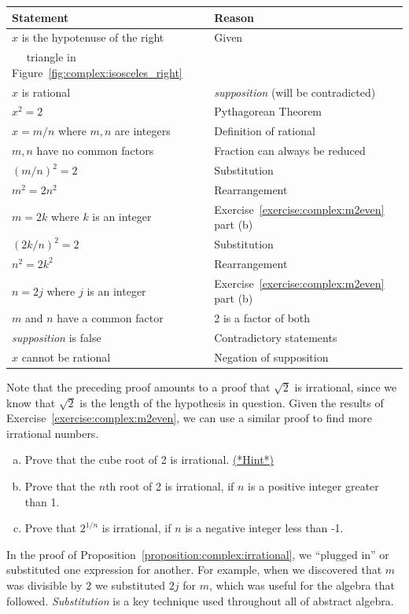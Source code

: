 \begin{tabular}{l| l}
Statement& Reason\\
\hline
$x$ is the hypotenuse of the right & Given\\
~~ triangle in Figure~\ref{fig:complex:isosceles_right} & ~\\
$x$ is rational & \emph{supposition} (will be contradicted)\\
$x^2 = 2$ & Pythagorean Theorem\\
$x = m/n$ where $m,n$ are integers& Definition of rational\\
$m, n$ have no common factors & Fraction can always be reduced\\
$(m/n)^2 = 2$ & Substitution\\
$m^2 = 2n^2$ & Rearrangement\\
$m = 2k$ where $k$ is an integer & Exercise~\ref{exercise:complex:m2even} part (b)\\
$(2k/n)^2 = 2$ & Substitution\\
$n^2 = 2k^2$& Rearrangement\\
$n = 2j$ where  $j$ is an integer&Exercise~\ref{exercise:complex:m2even} part (b)\\
$m$ and $n$ have a common factor& 2 is a factor of both\\
\emph{supposition} is false & Contradictory statements\\
$x$ cannot be rational &  Negation of supposition
\end{tabular}

Note that the preceding proof amounts to a proof that $\sqrt{2}$ is irrational, since we know that $\sqrt{2}$ is the length of the hypothesis in question. Given the results of Exercise~\ref{exercise:complex:m2even}, we can use a similar proof to find more irrational numbers.

\begin{exercise}{6}
\begin{enumerate}[(a)]
\item
Prove that the cube root of 2 is irrational.
\hyperref[sec:complex:hints]{(*Hint*)} 
\item
Prove that the $n$th root of 2 is irrational, if $n$ is a positive integer greater than 1.
\item
Prove that $2^{1/n}$ is irrational, if $n$ is a negative integer less than -1.
\end{enumerate}
\end{exercise}

In the proof of Proposition~\ref{proposition:complex:irrational},  we ``plugged in'' or substituted one expression for another.   For example, when we discovered that $m$ was divisible by 2 we substituted $2j$ for $m$, which was useful for the algebra that followed.
\emph{Substitution} is a key technique used throughout all of abstract algebra.

